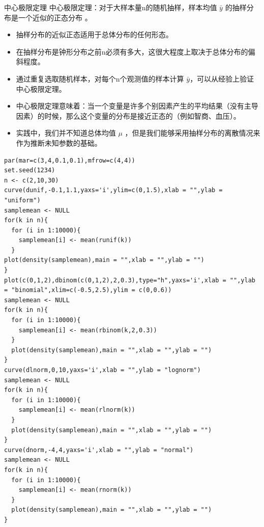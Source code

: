 \documentclass[presentation]{beamer}
\begin{document}
\begin{frame}[fragile,label={sec:org96f6152}]{中心极限定理}
 中心极限定理：对于大样本量n的随机抽样，样本均值 \(\bar y\) 的抽样分布是一个近似的正态分布  。

\begin{itemize}
\item 抽样分布的近似正态适用于总体分布的任何形态。
\item 在抽样分布是钟形分布之前n必须有多大，这很大程度上取决于总体分布的偏斜程度。
\item 通过重复选取随机样本，对每个n个观测值的样本计算 \(\bar y\)，可以从经验上验证中心极限定理。
\item 中心极限定理意味着：当一个变量是许多个别因素产生的平均结果（没有主导因素）的时候，那么这个变量的分布是接近正态的（例如智商、血压）。
\item 实践中，我们并不知道总体均值 \(\mu\) ，但是我们能够采用抽样分布的离散情况来作为推断未知参数的基础。
\end{itemize}
\begin{verbatim}
par(mar=c(3,4,0.1,0.1),mfrow=c(4,4))
set.seed(1234)
n <- c(2,10,30)
curve(dunif,-0.1,1.1,yaxs='i',ylim=c(0,1.5),xlab = "",ylab = "uniform")
samplemean <- NULL
for(k in n){
  for (i in 1:10000){
    samplemean[i] <- mean(runif(k))
  }  
plot(density(samplemean),main = "",xlab = "",ylab = "")
}
plot(c(0,1,2),dbinom(c(0,1,2),2,0.3),type="h",yaxs='i',xlab = "",ylab = "binomial",xlim=c(-0.5,2.5),ylim = c(0,0.6))
samplemean <- NULL
for(k in n){
  for (i in 1:10000){
    samplemean[i] <- mean(rbinom(k,2,0.3))
  }  
  plot(density(samplemean),main = "",xlab = "",ylab = "")
}
curve(dlnorm,0,10,yaxs='i',xlab = "",ylab = "lognorm")
samplemean <- NULL
for(k in n){
  for (i in 1:10000){
    samplemean[i] <- mean(rlnorm(k))
  }  
  plot(density(samplemean),main = "",xlab = "",ylab = "")
}
curve(dnorm,-4,4,yaxs='i',xlab = "",ylab = "normal")
samplemean <- NULL
for(k in n){
  for (i in 1:10000){
    samplemean[i] <- mean(rnorm(k))
  }  
  plot(density(samplemean),main = "",xlab = "",ylab = "")
}
\end{verbatim}


\end{frame}
\end{document}
